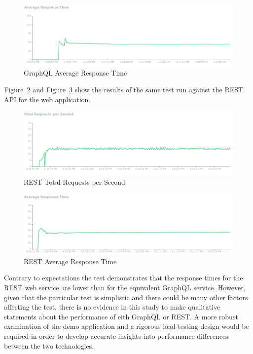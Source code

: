 \begin{figure}[htb]
  \centering\includegraphics[width=\columnwidth]
  {./images/graphql_response.png}
  \caption{GraphQL Average Response Time}\label{f:graphql_response}
\end{figure}

Figure~\ref{f:rest_requests} and Figure~\ref{f:rest_response} show the results 
of the same test run against the REST API for the web application.

\begin{figure}[htb]
  \centering\includegraphics[width=\columnwidth]
  {./images/rest_requests.png}
  \caption{REST Total Requests per Second}\label{f:rest_requests}
\end{figure}

\begin{figure}[htb]
  \centering\includegraphics[width=\columnwidth]
  {./images/rest_response.png}
  \caption{REST Average Response Time}\label{f:rest_response}
\end{figure}

Contrary to expectations the test demonstrates that the response times for the 
REST web service are lower than for the equivalent GraphQL service.  However, 
given that the particular test is simplistic and there could be many other 
factors affecting the test, there is no evidence in this study to make 
qualitative statements about the performance of eith GraphQL or REST.  A more 
robust examination of the demo application and a rigorous load-testing design 
would be required in order to develop accurate insights into performance 
differences between the two technologies.

